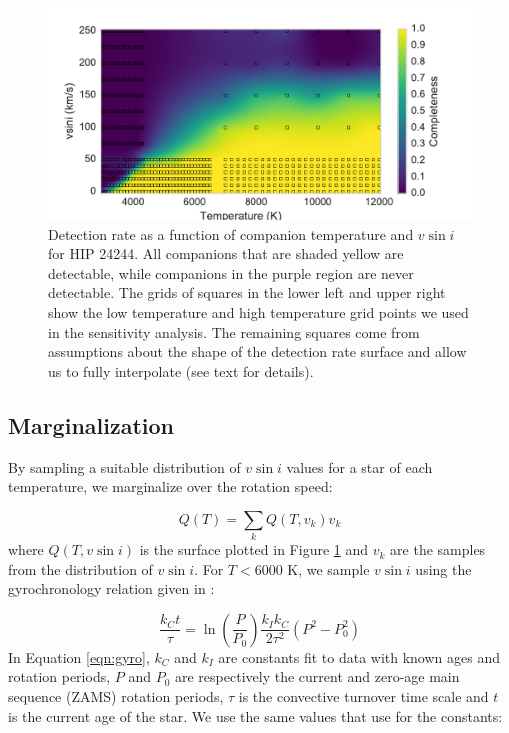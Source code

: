 \documentclass{emulateapj}
\begin{document}
\begin{figure}
\includegraphics[width=\columnwidth]{HIP_24244_20130919.pdf}
\caption{Detection rate as a function of companion temperature and $v\sin{i}$ for HIP 24244. All companions that are shaded yellow are detectable, while companions in the purple region are never detectable. The grids of squares in the lower left and upper right show the low temperature and high temperature grid points we used in the sensitivity analysis. The remaining squares come from assumptions about the shape of the detection rate surface and allow us to fully interpolate (see text for details).}
\label{fig:detrate_2d}
\end{figure}

\subsection{Marginalization}
By sampling a suitable distribution of $v\sin{i}$ values for a star of each temperature, we marginalize over the rotation speed:

\begin{equation}
Q(T) = \sum_k Q(T, v_k) v_k 
\end{equation} 
where $Q(T, v\sin{i})$ is the surface plotted in Figure \ref{fig:detrate_2d} and $v_k$ are the samples from the distribution of $v\sin{i}$. For $T < 6000$ K, we sample $v\sin{i}$ using the gyrochronology relation given in \citet{Barnes2010b}:

\begin{equation}
\frac{k_Ct}{\tau} = \ln\left ( \frac{P}{P_0} \right ) \frac{k_Ik_C}{2\tau^2} (P^2 - P_0^2)
\label{eqn:gyro}
\end{equation}
In Equation \ref{eqn:gyro}, $k_C$ and $k_I$ are constants fit to data with known ages and rotation periods, $P$ and $P_0$ are respectively the current and zero-age main sequence (ZAMS) rotation periods, $\tau$ is the convective turnover time scale and $t$ is the current age of the star. We use the same values that \cite{Barnes2010b} use for the constants:
\end{document}
